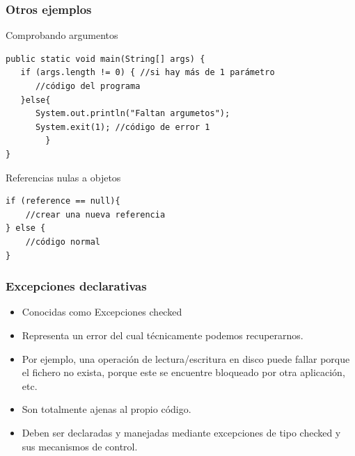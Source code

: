 \documentclass{beamer}
\begin{document}
\begin{frame}[fragile]
\frametitle{Otros ejemplos}
\begin{footnotesize}
\begin{block}{Comprobando argumentos}
\begin{verbatim}
public static void main(String[] args) {
   if (args.length != 0) { //si hay más de 1 parámetro
      //código del programa
   }else{
      System.out.println("Faltan argumetos");
      System.exit(1); //código de error 1
        }
}
\end{verbatim}
\end{block}
\pause
\begin{block}{Referencias nulas a objetos}
\begin{verbatim}
if (reference == null){    
    //crear una nueva referencia
} else {    
    //código normal
}
\end{verbatim}
\end{block}
\end{footnotesize}
\end{frame}

\begin{frame}
\frametitle{Excepciones declarativas}
\begin{itemize}[<+->]
\item Conocidas como \alert{Excepciones checked}
\item Representa un error del cual técnicamente podemos recuperarnos.
\item Por ejemplo, una operación de lectura/escritura en disco puede fallar porque el fichero no exista, porque este se encuentre bloqueado por otra aplicación, etc. 
\item Son totalmente ajenas al propio código.
\item Deben ser declaradas y manejadas mediante excepciones de tipo checked y sus mecanismos de control.
\end{itemize}
\end{frame}
\end{document}
